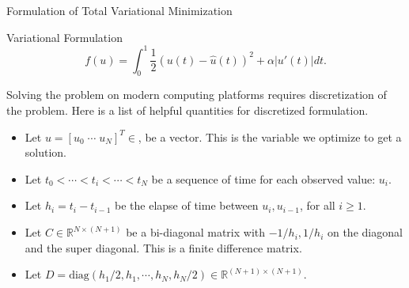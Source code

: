 \documentclass[11pt]{beamer}
\theoremstyle{definition}
\begin{document}
    \begin{frame}{Formulation of Total Variational Minimization}
        \begin{block}{Variational Formulation}
            \[
                f(u) = \int_0^1 \frac{1}{2} 
                (u(t) - \hat u(t))^2 + \alpha |u'(t)|dt. 
            \]    
        \end{block}
        Solving the problem on modern computing platforms requires discretization of the problem. 
        Here is a list of helpful quantities for discretized formulation. 
        \begin{itemize}
            \item Let $u = [u_0\; \cdots \; u_{N}]^T \in $, be a vector. 
            This is the variable we optimize to get a solution. 
            \item Let $t_0< \cdots<  t_i <\cdots <t_N$ be a sequence of time for each observed value: $u_i$. 
            \item Let $h_i=t_{i} - t_{i - 1}$ be the elapse of time between $u_i, u_{i - 1}$, for all $i \ge 1$. 
            \item Let $C\in \mathbb R^{N\times (N + 1)}$ be a bi-diagonal matrix with $-1/h_i, 1/h_i$ on the diagonal and the super diagonal. 
            This is a finite difference matrix. 
            \item Let $D= \text{diag}(h_1/2, h_1,\cdots, h_N, h_{N}/2) \in \mathbb R^{(N + 1)\times(N + 1)}$. 
        \end{itemize}
    \end{frame}
\end{document}
